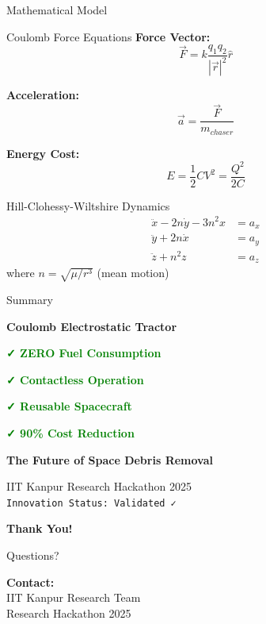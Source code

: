 \documentclass[aspectratio=169]{beamer}
\begin{document}
\begin{frame}{Mathematical Model}
\begin{block}{Coulomb Force Equations}
\textbf{Force Vector:}
\begin{equation}
\vec{F} = k \frac{q_1 q_2}{|\vec{r}|^2} \hat{r}
\end{equation}

\textbf{Acceleration:}
\begin{equation}
\vec{a} = \frac{\vec{F}}{m_{chaser}}
\end{equation}

\textbf{Energy Cost:}
\begin{equation}
E = \frac{1}{2} C V^2 = \frac{Q^2}{2C}
\end{equation}
\end{block}

\begin{block}{Hill-Clohessy-Wiltshire Dynamics}
\begin{align}
\ddot{x} - 2n\dot{y} - 3n^2x &= a_x \\
\ddot{y} + 2n\dot{x} &= a_y \\
\ddot{z} + n^2z &= a_z
\end{align}
where $n = \sqrt{\mu/r^3}$ (mean motion)
\end{block}
\end{frame}

\begin{frame}{Summary}
\begin{center}
\LARGE\textbf{Coulomb Electrostatic Tractor}

\vspace{2em}

\Large
\textcolor{green}{\textbf{✓ ZERO Fuel Consumption}}

\textcolor{green}{\textbf{✓ Contactless Operation}}

\textcolor{green}{\textbf{✓ Reusable Spacecraft}}

\textcolor{green}{\textbf{✓ 90\% Cost Reduction}}

\vspace{2em}

\textbf{The Future of Space Debris Removal}

\vspace{1em}

\normalsize
IIT Kanpur Research Hackathon 2025\\
\texttt{Innovation Status: Validated ✓}
\end{center}
\end{frame}

\begin{frame}
\begin{center}
\Huge\textbf{Thank You!}

\vspace{2em}

\Large Questions?

\vspace{2em}

\normalsize
\textbf{Contact:}\\
IIT Kanpur Research Team\\
Research Hackathon 2025
\end{center}
\end{frame}
\end{document}
